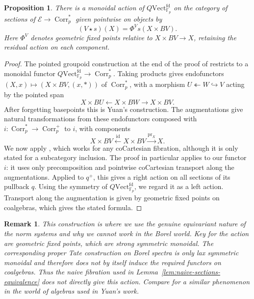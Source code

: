 \documentclass[11pt,a4paper]{article}
\newtheorem{prop}[thm]{Proposition}
\newtheorem{remark}[thm]{Remark}
\theoremstyle{definition}
\newcommand{\Fp}{\mathbb F_p}
\newcommand{\Corr}{\operatorname{Corr}_p}
\newcommand{\id}{\mathrm{id}}
\newcommand{\Vect}{\mathrm{Vect}^{\mathrm{fd}}_{\Fp}}
\begin{document}
\begin{prop}\label{prop:action}
There is a monoidal action of $Q\Vect$ on the category of sections of $\mathcal E \to \Corr^*$
given pointwise on objects by
\begin{equation*}
 (V \star s)(X)=\Phi^V s(X\times BV).
\end{equation*}
Here $\Phi^V$ denotes geometric fixed points relative to
$X\times BV\to X$, retaining the residual action on each component.
\end{prop}
\begin{proof}
The pointed groupoid construction at the end of the proof of
\cite[Proposition~3.24]{Yuan} restricts to a monoidal functor
$Q\Vect\to\Corr^*$. Taking products gives endofunctors
$(X,x)\mapsto(X\times BV,(x,*))$ of $\Corr^*$, with a morphism
$U\twoheadleftarrow W\hookrightarrow V$ acting by the pointed span
\[
 X\times BU\longleftarrow X\times BW\longrightarrow X\times BV.
\]
After forgetting basepoints this is Yuan's construction.
The augmentations give natural transformations
from these endofunctors composed with $i:\Corr^*\to\Corr^+$ to $i$,
with components
\[
 X\times BV\xleftarrow{\id}X\times BV\xrightarrow{\mathrm{pr}_X}X.
\]
We now apply \cite[Proposition~A.10]{Yuan}, which works for any
coCartesian fibration, although it is only stated for a subcategory inclusion. The proof in particular applies to our functor $i$: it uses only precomposition
and pointwise coCartesian transport along the augmentations.
Applied to $q^{+}$, this gives a right action on all sections
of its pullback $q$. Using the symmetry of $Q\Vect$, we regard
it as a left action. Transport along the augmentation is
given by geometric fixed points on coalgebras, which gives
the stated formula.
\end{proof}

\begin{remark}
This construction is where we use the genuine equivariant nature of the norm systems and why we cannot work  in the Borel world.
Key for the action are geometric fixed points, which
are strong symmetric monoidal.
The corresponding proper Tate construction on Borel spectra is only
lax symmetric monoidal and therefore does not by itself induce
the required functors on coalgebras. Thus the naive fibration used in
Lemma~\ref{lem:naive-sections-equivalence} does not directly give this action.
Compare \cite[Remark 3.36]{Yuan} for a similar phenomenon in the world of algebras used in Yuan's work. 
\end{remark}
\end{document}
